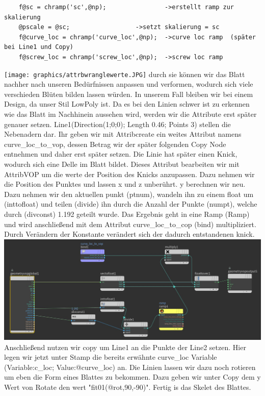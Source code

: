 \begin{​itemize}
\begin{lstlisting}
	f@sc = chramp('sc',@np);				->erstellt ramp zur skalierung
	@pscale = @sc;					->setzt skalierung = sc
	f@curve_loc = chramp('curve_loc',@np); 	->curve loc ramp  (später bei Line1 und Copy)
	f@screw_loc = chramp('screw_loc',@np);	->screw loc ramp
\end{lstlisting} 
\texttt{[image: graphics/attrbwranglewerte.JPG]}
durch sie können wir das Blatt nachher nach unseren Bedürfnissen anpassen und verformen, wodurch sich viele verschieden Blüten bilden lassen würden. In unserem Fall bleiben wir bei einem Design, da unser Stil LowPoly ist. Da es bei den Linien schwer ist zu erkennen wie das Blatt im Nachhinein aussehen wird, werden wir die Attribute erst später genauer setzen.
Line1(Direction(1;0;0); Length 0.46; Points 3) stellen die Nebenadern dar. Ihr geben wir mit Attribcreate ein weites Attribut namens curve_loc_to_vop, dessen Betrag wir der später folgenden Copy Node entnehmen und daher erst später setzen. Die Linie hat später einen Knick, wodurch sich eine Delle im Blatt bildet.
Dieses Attribut bearbeiten wir mit AttribVOP um die werte der Position des Knicks anzupassen. Dazu nehmen wir die Position des Punktes und lassen x und z unberührt. y berechnen wir neu. Dazu nehmen wir den aktuellen punkt (ptnum), wandeln ihn zu einem float um (inttofloat) und teilen (divide) ihn durch die Anzahl der Punkte (numpt), welche durch (divconst) 1.192 geteilt wurde. Das Ergebnis geht in eine Ramp (Ramp) und wird anschließend mit dem Attribut curve_loc_to_cop (bind) multipliziert. Durch Verändern der Konstante verändert sich der dadurch entstandenen knick. 
\includegraphics*[width=\textwidth]{graphics/attribvop.JPG}
Anschließend nutzen wir copy um Line1 an die Punkte der Line2 setzen. Hier legen wir jetzt unter Stamp die bereits erwähnte curve_loc Variable (Variable:c_loc; Value:@curve_loc) an. Die Linien lassen wir dazu noch rotieren um eben die Form eines Blattes zu bekommen. Dazu geben wir unter Copy dem y Wert von Rotate den wert "fit01(@rot,90,-90)". Fertig is das Skelet des Blattes.

\end{​itemize}
